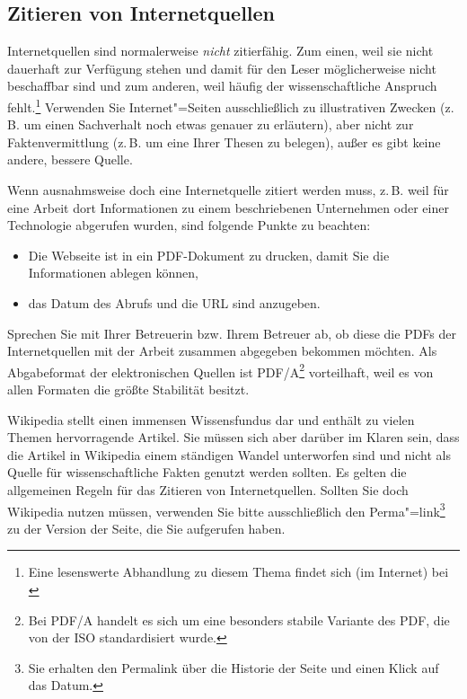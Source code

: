 \documentclass[a4paper,11pt,headings=normal]{scrartcl}
\begin{document}
\subsection{Zitieren von Internetquellen}
Internetquellen sind normalerweise \textit{nicht} zitierfähig. Zum einen, weil sie nicht dauerhaft zur Verfügung stehen und damit für den Leser möglicherweise nicht beschaffbar sind und zum anderen, weil häufig der wissenschaftliche Anspruch fehlt.\footnote{Eine lesenswerte Abhandlung zu diesem Thema findet sich (im Internet) bei \autocite{Weber2006}} Verwenden Sie Internet"=Seiten ausschließlich zu illustrativen Zwecken (z.\,B. um einen Sachverhalt noch etwas genauer zu erläutern), aber nicht zur Faktenvermittlung (z.\,B. um eine Ihrer Thesen zu belegen), außer es gibt keine andere, bessere Quelle.

Wenn ausnahmsweise doch eine Internetquelle zitiert werden muss, z.\,B. weil für eine Arbeit dort Informationen zu einem beschriebenen Unternehmen oder einer Technologie abgerufen wurden, sind folgende Punkte zu beachten:

\begin{itemize}
\item Die Webseite ist in ein PDF-Dokument zu drucken, damit Sie die Informationen ablegen können,
\item das Datum des Abrufs und die URL sind anzugeben.
\end{itemize}

Sprechen Sie mit Ihrer Betreuerin bzw. Ihrem Betreuer ab, ob diese die PDFs der Internetquellen mit der Arbeit zusammen abgegeben bekommen möchten. Als Abgabeformat der elektronischen Quellen ist PDF/A\footnote{Bei PDF/A handelt es sich um eine besonders stabile Variante des \ac{PDF}, die von der \ac{ISO} standardisiert wurde.} vorteilhaft, weil es von allen Formaten die größte Stabilität besitzt.

Wikipedia stellt einen immensen Wissensfundus dar und enthält zu vielen Themen hervorragende Artikel. Sie müssen sich aber darüber im Klaren sein, dass die Artikel in Wikipedia einem ständigen Wandel unterworfen sind und nicht als Quelle für wissenschaftliche Fakten genutzt werden sollten. Es gelten die allgemeinen Regeln für das Zitieren von Internetquellen. Sollten Sie doch Wikipedia nutzen müssen, verwenden Sie bitte ausschließlich den Perma"=link\footnote{Sie erhalten den Permalink über die Historie der Seite und einen Klick auf das Datum.} zu der Version der Seite, die Sie aufgerufen haben.
\end{document}
